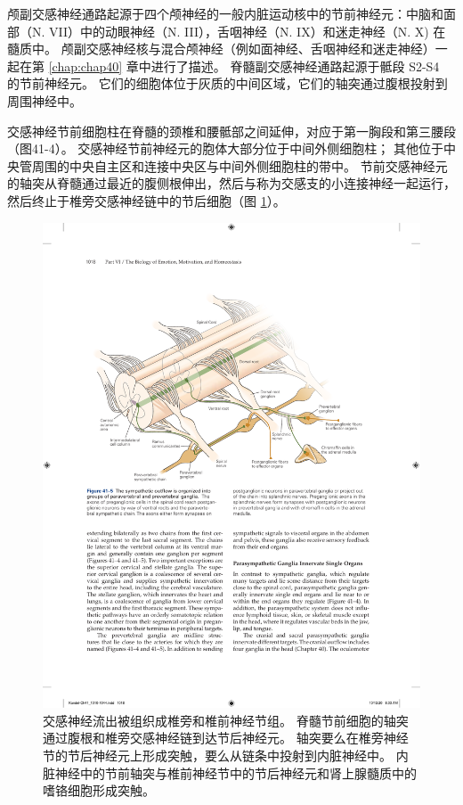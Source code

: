 颅副交感神经通路起源于四个颅神经的一般内脏运动核中的节前神经元：中脑和面部（N. VII）中的动眼神经（N. III），舌咽神经（N. IX）和迷走神经（N. X) 在髓质中。 颅副交感神经核与混合颅神经（例如面神经、舌咽神经和迷走神经）一起在第 \ref{chap:chap40} 章中进行了描述。 脊髓副交感神经通路起源于骶段 S2-S4 的节前神经元。 它们的细胞体位于灰质的中间区域，它们的轴突通过腹根投射到周围神经中。

交感神经节前细胞柱在脊髓的颈椎和腰骶部之间延伸，对应于第一胸段和第三腰段（图41-4）。 交感神经节前神经元的胞体大部分位于中间外侧细胞柱； 其他位于中央管周围的中央自主区和连接中央区与中间外侧细胞柱的带中。 
节前交感神经元的轴突从脊髓通过最近的腹侧根伸出，然后与称为交感支的小连接神经一起运行，然后终止于椎旁交感神经链中的节后细胞（图 \ref{fig:41_5}）。

\begin{figure}[htbp]
	\centering
	\includegraphics[width=0.95\linewidth]{chap41/fig_41_5}
	\caption{交感神经流出被组织成椎旁和椎前神经节组。 脊髓节前细胞的轴突通过腹根和椎旁交感神经链到达节后神经元。 轴突要么在椎旁神经节的节后神经元上形成突触，要么从链条中投射到内脏神经中。 内脏神经中的节前轴突与椎前神经节中的节后神经元和肾上腺髓质中的嗜铬细胞形成突触。}
	\label{fig:41_5}
\end{figure}

